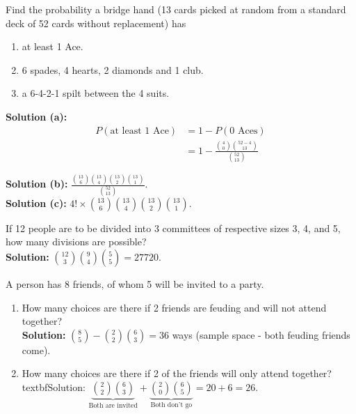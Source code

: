 \begin{example}
    Find the probability a bridge hand (13 cards picked at random from a standard deck of 52 cards without replacement) has
    \begin{enumerate}[label={(\alph*)}]
        \item at least 1 Ace.
        \item 6 spades, 4 hearts, 2 diamonds and 1 club.
        \item a 6-4-2-1 spilt between the 4 suits.
    \end{enumerate}
    \textbf{Solution (a): } \vspace*{-5mm}
    \begin{align*}
        P(\text{at least 1 Ace}) &= 1 - P(\text{0 Aces}) \\
        &= 1 - \frac{\binom{4}{0} \binom{52-4}{13}}{\binom{52}{13}}
    \end{align*}

    \textbf{Solution (b): } \vspace*{-3mm}
    $\frac{\binom{13}{6} \binom{13}{4} \binom{13}{2} \binom{13}{1}}{\binom{52}{13}}$. \\

    \textbf{Solution (c): } \vspace*{-3mm}
    $4! \times \binom{13}{6}\binom{13}{4}\binom{13}{2}\binom{13}{1}$. \vspace{2mm}
\end{example}

\begin{example}
    If 12 people are to be divided into 3 committees of respective sizes 3, 4, and 5,
    how many divisions are possible? \\
    \textbf{Solution: }
    $\binom{12}{3} \binom{9}{4} \binom{5}{5} = 27720$.
\end{example}

\begin{example}
    A person has 8 friends, of whom 5 will be invited to a party. 
    \begin{enumerate}[label=(\alph*)]
        \item How many choices are there if 2 friends are feuding and will not attend together? \\
        \textbf{Solution: } 
        $\binom{8}{5} - \binom{2}{2}\binom{6}{3} = 36$ ways (sample space - both feuding friends come).
        \item How many choices are there if 2 of the friends will only attend together? \\
        textbf{Solution: }
        $\underbrace{\binom{2}{2} \binom{6}{3}}_{\text{Both are invited}}  + \underbrace{\binom{2}{0} \binom{6}{5}}_{\text{Both don't go}}  = 20 + 6 = 26$. 
    \end{enumerate}
\end{example}

